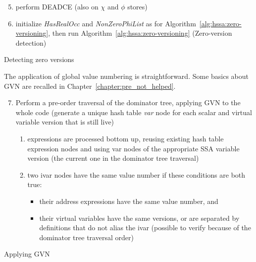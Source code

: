\begin{algorithm}[H]
\begin{enumerate}
\setcounter{enumi}{4}
\item\label{itm:hssa:deadce} perform DEADCE (also on $\chi$ and $\phi$ stores)
\item\label{itm:hssa:init} initialize \emph{HasRealOcc} and \emph{NonZeroPhiList} as for Algorithm~\ref{alg:hssa:zero-versioning}, then run Algorithm~\ref{alg:hssa:zero-versioning} (Zero-version detection)
\end{enumerate}
\caption{\label{algo:hssa:zeroversion}Detecting zero versions}
\end{algorithm}

The application of global value numbering is straightforward. Some basics about GVN are recalled in Chapter~\ref{chapter:pre_not_helped}. 

\begin{algorithm}[H]
\begin{enumerate}
\setcounter{enumi}{6}
\item Perform a pre-order traversal of the dominator tree, applying GVN to the whole code (generate a unique hash table \emph{var} node for each scalar and virtual variable version that is still live)
  \begin{enumerate}
    \item expressions are processed bottom up, reusing existing hash table expression nodes and using var nodes of the appropriate SSA variable version (the current one in the dominator tree traversal)
    \item two ivar nodes have the same value number if these conditions are both true:
      \begin{itemize}
        \item their address expressions have the same value number, and
        \item their virtual variables have the same versions, or are separated by definitions that do not alias the ivar (possible to verify because of the dominator tree traversal order)
      \end{itemize}
  \end{enumerate}
\end{enumerate}
\caption{\label{algo:hssa:gvnfinal}Applying GVN}
\end{algorithm}


